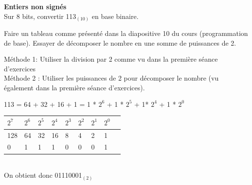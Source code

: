 \begin{Exercice}[5 minutes] \textbf{Entiers non signés}\\
	Sur 8 bits, convertir 113$_{(10)}$ en base binaire.
   
    \begin{conseil}
		Faire un tableau comme présenté dans la diapositive 10 du cours (programmation de base). Essayer de décomposer le nombre en une somme de puissances de 2.
    \end{conseil}
    
    \begin{solution}
        Méthode 1: Utiliser la division par 2 comme vu dans la première séance d'exercices\\
        
        Méthode 2 : Utiliser les puissances de 2 pour décomposer le nombre (vu également dans la première séance d'exercices).
        
        113 = 64 + 32 + 16 + 1 = 1 * $2^6$ + 1 * $2^5$ + 1* $2^4$ + 1 * $2^0$ \\
        
        \begin{tabular}{| p{1cm} | p{1cm} | p{1cm} | p{1cm} | p{1cm} | p{1cm} | p{1cm} | p{1cm} | p{1cm} |} 
            \hline
	      	$2^7$ & $2^6$ & $2^5$ & $2^4$ & $2^3$ & $2^2$ & $2^1$ & $2^0$ \\ [0.5ex]
	    	\hline
            128 & 64 & 32 & 16 & 8 & 4 & 2 & 1 \\ [0.5ex] 
            \hline
            0 & 1 & 1 & 1 & 0 & 0 & 0 & 1 \\ [0.5ex] 
            \hline
        \end{tabular} \\
        
        On obtient donc 01110001$_{(2)}$ \\
    \end{solution}
\end{Exercice}

